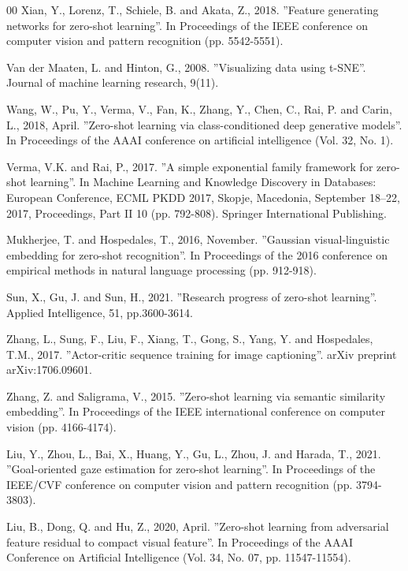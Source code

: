 \documentclass{article}
\begin{document}
\begin{thebibliography}{00}
 Xian, Y., Lorenz, T., Schiele, B. and Akata, Z., 2018. ''Feature generating networks for zero-shot learning''. In Proceedings of the IEEE conference on computer vision and pattern recognition (pp. 5542-5551).

 Van der Maaten, L. and Hinton, G., 2008. ''Visualizing data using t-SNE''. Journal of machine learning research, 9(11).

 Wang, W., Pu, Y., Verma, V., Fan, K., Zhang, Y., Chen, C., Rai, P. and Carin, L., 2018, April. ''Zero-shot learning via class-conditioned deep generative models''. In Proceedings of the AAAI conference on artificial intelligence (Vol. 32, No. 1).

 Verma, V.K. and Rai, P., 2017. ''A simple exponential family framework for zero-shot learning''. In Machine Learning and Knowledge Discovery in Databases: European Conference, ECML PKDD 2017, Skopje, Macedonia, September 18–22, 2017, Proceedings, Part II 10 (pp. 792-808). Springer International Publishing.

 Mukherjee, T. and Hospedales, T., 2016, November. ''Gaussian visual-linguistic embedding for zero-shot recognition''. In Proceedings of the 2016 conference on empirical methods in natural language processing (pp. 912-918).

 Sun, X., Gu, J. and Sun, H., 2021. ''Research progress of zero-shot learning''. Applied Intelligence, 51, pp.3600-3614.

 Zhang, L., Sung, F., Liu, F., Xiang, T., Gong, S., Yang, Y. and Hospedales, T.M., 2017. ''Actor-critic sequence training for image captioning''. arXiv preprint arXiv:1706.09601.

 Zhang, Z. and Saligrama, V., 2015. ''Zero-shot learning via semantic similarity embedding''. In Proceedings of the IEEE international conference on computer vision (pp. 4166-4174).

 Liu, Y., Zhou, L., Bai, X., Huang, Y., Gu, L., Zhou, J. and Harada, T., 2021. ''Goal-oriented gaze estimation for zero-shot learning''. In Proceedings of the IEEE/CVF conference on computer vision and pattern recognition (pp. 3794-3803).

 Liu, B., Dong, Q. and Hu, Z., 2020, April. ''Zero-shot learning from adversarial feature residual to compact visual feature''. In Proceedings of the AAAI Conference on Artificial Intelligence (Vol. 34, No. 07, pp. 11547-11554).


\end{thebibliography}
\end{document}
